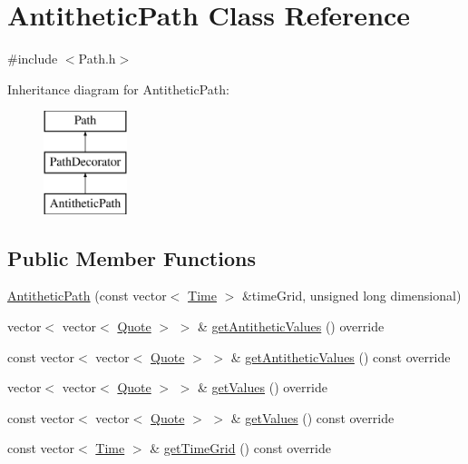 \hypertarget{class_antithetic_path}{}\section{Antithetic\+Path Class Reference}
\label{class_antithetic_path}


{\ttfamily \#include $<$Path.\+h$>$}

Inheritance diagram for Antithetic\+Path\+:\begin{figure}[H]
\begin{center}
\leavevmode
\includegraphics[height=3.000000cm]{class_antithetic_path}
\end{center}
\end{figure}
\subsection*{Public Member Functions}
\begin{DoxyCompactItemize}
\item 
\hyperlink{class_antithetic_path_a3064f50d9c097f15a0472c94871911cc}{Antithetic\+Path} (const vector$<$ \hyperlink{_name_def_8h_ac2d3e0ba793497bcca555c7c2cf64ff3}{Time} $>$ \&time\+Grid, unsigned long dimensional)
\item 
vector$<$ vector$<$ \hyperlink{_name_def_8h_a642a6c5fd87319d922637de0e0bb0305}{Quote} $>$ $>$ \& \hyperlink{class_antithetic_path_a7f94c2a66c0d16ebedba930fbca9d859}{get\+Antithetic\+Values} () override
\item 
const vector$<$ vector$<$ \hyperlink{_name_def_8h_a642a6c5fd87319d922637de0e0bb0305}{Quote} $>$ $>$ \& \hyperlink{class_antithetic_path_a7b6c87162d9c4642dda68b4f9af5f653}{get\+Antithetic\+Values} () const override
\item 
vector$<$ vector$<$ \hyperlink{_name_def_8h_a642a6c5fd87319d922637de0e0bb0305}{Quote} $>$ $>$ \& \hyperlink{class_antithetic_path_a631294808de3c75c98563f292464a7da}{get\+Values} () override
\item 
const vector$<$ vector$<$ \hyperlink{_name_def_8h_a642a6c5fd87319d922637de0e0bb0305}{Quote} $>$ $>$ \& \hyperlink{class_antithetic_path_ad15cfc2a074fd27bd3119ddafa24c3bd}{get\+Values} () const override
\item 
const vector$<$ \hyperlink{_name_def_8h_ac2d3e0ba793497bcca555c7c2cf64ff3}{Time} $>$ \& \hyperlink{class_antithetic_path_a8986e32381ea393159a15dc2b1c0b12c}{get\+Time\+Grid} () const override
\end{DoxyCompactItemize}
